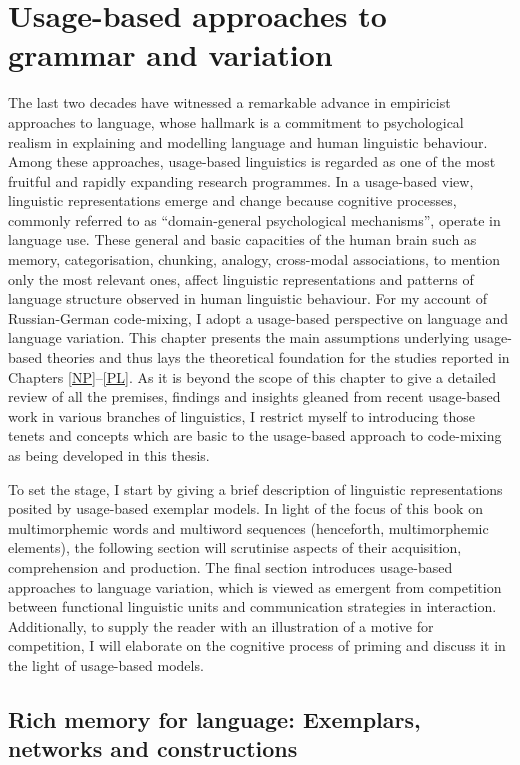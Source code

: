 \chapter{Usage-based approaches to grammar and variation}\label{UBL}

The last two decades have witnessed a remarkable advance in empiricist approaches to language, whose hallmark is a commitment to psychological realism in explaining and modelling language and human linguistic behaviour. Among these approaches, usage-based linguistics is regarded as one of the most fruitful and rapidly expanding research programmes. In a usage-based view, linguistic representations emerge and change because cognitive processes, commonly referred to as “domain-general psychological mechanisms”, operate in language use. These general and basic capacities of the human brain such as memory, categorisation, chunking, analogy, cross-modal associations, to mention only the most relevant ones, affect linguistic representations and patterns of language structure observed in human linguistic behaviour. For my account of Russian-German code-mixing, I adopt a usage-based perspective on language and language variation. This chapter presents the main assumptions underlying usage-based theories and thus lays the theoretical foundation for the studies reported in Chapters \ref{NP}--\ref{PL}. As it is beyond the scope of this chapter to give a detailed review of all the premises, findings and insights gleaned from recent usage-based work in various branches of linguistics, I restrict myself to introducing those tenets and concepts  which are basic to the usage-based approach to code-mixing as being developed in this thesis. 

To set the stage, I start by giving a brief description of linguistic representations posited by usage-based exemplar models. In light of the focus of this book on multimorphemic words and multiword sequences (henceforth, multimorphemic elements), the following section will scrutinise aspects of their acquisition, comprehension and production. The final section introduces usage-based approaches to language variation, which is viewed as emergent from competition between functional linguistic units and communication strategies in interaction. Additionally, to supply the reader with an illustration of a motive for competition, I will elaborate on the cognitive process of priming and discuss it in the light of usage-based models.

\section{Rich memory for language: Exemplars, networks and constructions}
\label{sec:exemplars}

